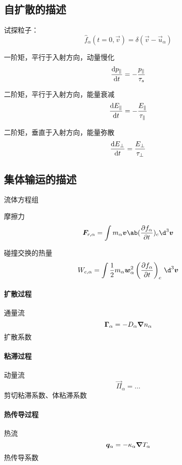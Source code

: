 \subsection{自扩散的描述}

试探粒子：
\begin{equation}
\hat{f}_\alpha(t=0,\vec{v})=\delta(\vec{v}-\vec{u}_\alpha)
\end{equation}

一阶矩，平行于入射方向，动量慢化
\begin{equation}
\odv{p_\parallel}{t} = - \frac{p_\parallel}{\tau_s}
\end{equation}

二阶矩，平行于入射方向，能量衰减
\begin{equation}
\odv{E_\parallel}{t} = - \frac{E_\parallel}{\tau_\parallel}
\end{equation}

二阶矩，垂直于入射方向，能量弥散
\begin{equation}
\odv{E_\perp}{t} = \frac{E_\perp}{\tau_\perp}
\end{equation}

\subsection{集体输运的描述}

流体方程组

摩擦力
\begin{equation}
\vec{F}_{r,\alpha} = \int m_\alpha \vec{v} \ab(\pdv{f_\alpha}{t})_c \d^3\vec{v}
\end{equation}

碰撞交换的热量
\begin{equation}
W_{c,\alpha} = \int \frac{1}{2} m_\alpha \vec{w}_\alpha^2 \left( \pdv{f_\alpha}{t} \right)_c \, \d^3 \vec{v}
\end{equation}

\paragraph{扩散过程}
通量流
\begin{equation}
\bm{\Gamma}_\alpha = - D_\alpha \bm{\nabla}{n_\alpha}
\end{equation}
扩散系数

\paragraph{粘滞过程}
动量流
\begin{equation}
\vec{\Pi}_\alpha = ...
\end{equation}
剪切粘滞系数、体粘滞系数

\paragraph{热传导过程}
热流
\begin{equation}
\bm{q}_\alpha = - \kappa_\alpha \bm{\nabla}{T_\alpha}
\end{equation}
热传导系数

